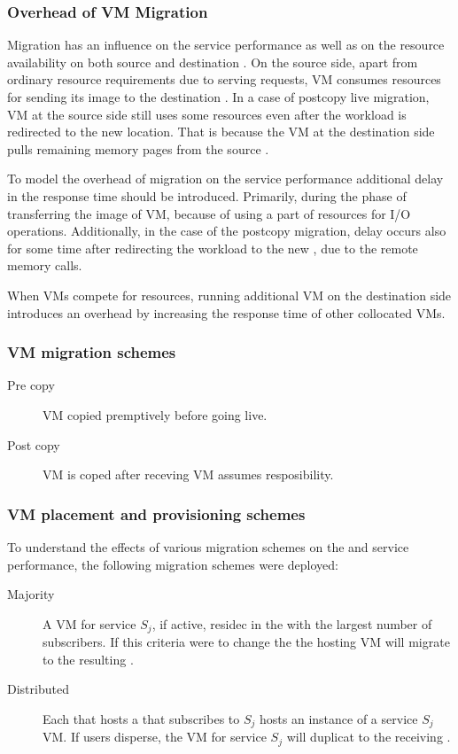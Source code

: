 \subsubsection{Overhead of VM Migration}
Migration has an influence on the service performance as well as on the resource availability on both source and destination \dc{}.
On the source side, apart from ordinary resource requirements due to serving requests, VM consumes resources for sending its image to the destination \dc{}.
In a case of postcopy live migration, VM at the source side still uses some resources even after the workload is redirected to the new location.
That is because the VM at the destination side pulls remaining memory pages from the source \dc{}.


To model the overhead of migration on the service performance additional delay in the response time should be introduced.
Primarily, during the phase of transferring the image of VM, because of using a part of resources for I/O operations.
Additionally, in the case of the postcopy migration, delay occurs also for some time after redirecting the workload to the new \dc{}, due to the remote memory calls.

When VMs compete for resources, running additional VM on the destination side introduces an overhead by increasing the response time of other collocated VMs.

\subsubsection{VM migration schemes}

\begin{description}
\item[Pre copy] VM copied premptively before going live.
\item[Post copy] VM is coped after receving VM assumes resposibility.
\end{description}

\subsubsection{VM placement and \dc{} provisioning schemes}
To understand the effects of various migration schemes on the \dc and service performance, the following migration schemes were deployed:

\begin{description}
\item[Majority] A VM for service $S_j$, if active, residec in the \dc with the largest number of subscribers. If this criteria were to change the the hosting VM will migrate to the resulting \dc.
\item[Distributed] Each \dc that hosts a \ue that subscribes to $S_j$ hosts an instance of a service $S_j$ VM. If users disperse, the VM for service $S_j$ will duplicat to the receiving \dc.
\end{description}